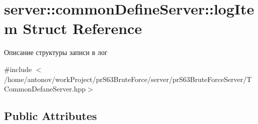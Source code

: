 \hypertarget{structserver_1_1common_define_server_1_1log_item}{}\section{server\+:\+:common\+Define\+Server\+:\+:log\+Item Struct Reference}
\label{structserver_1_1common_define_server_1_1log_item}


Описание структуры записи в лог  




{\ttfamily \#include $<$/home/antonov/work\+Project/pr\+S63\+Brute\+Force/server/pr\+S63\+Brute\+Force\+Server/\+T\+Common\+Defane\+Server.\+hpp$>$}

\subsection*{Public Attributes}
